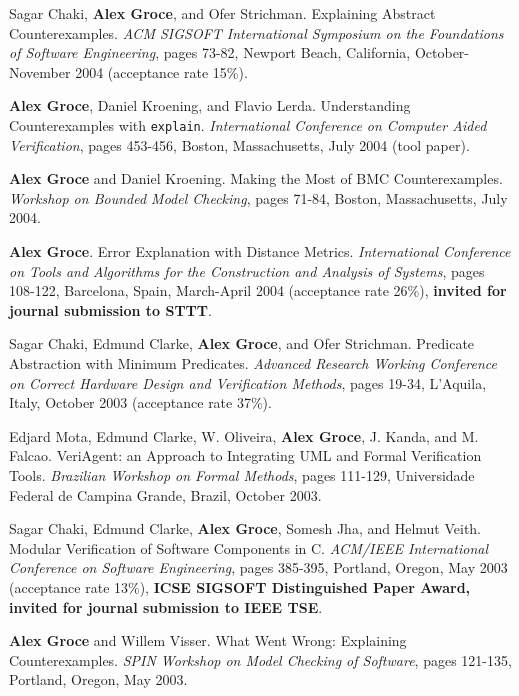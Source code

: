 \documentclass[ComputerScience]{vita}
\begin{document}
\begin{vita}
\begin{Refereed Conference and Workshop Publications}
\item
Sagar Chaki, {\bf Alex Groce}, and Ofer Strichman.
\newblock Explaining Abstract Counterexamples.
\newblock \emph{ACM SIGSOFT International Symposium on the Foundations of Software Engineering},  pages 73-82, Newport Beach, California, October-November 2004 (acceptance rate 15\%).

\item
{\bf Alex Groce}, Daniel Kroening, and Flavio Lerda.
\newblock Understanding Counterexamples with {\tt explain}.
\newblock \emph{International Conference on Computer Aided Verification},  pages 453-456, Boston, Massachusetts, July 2004 (tool paper).

\item
{\bf Alex Groce} and Daniel Kroening.
\newblock Making the Most of BMC Counterexamples.
\newblock \emph{Workshop on Bounded Model Checking},  pages 71-84, Boston, Massachusetts, July 2004.


\item
{\bf Alex Groce}.
\newblock Error Explanation with Distance Metrics.
\newblock \emph{International Conference on Tools and Algorithms for the Construction and Analysis of Systems}, pages 108-122, Barcelona, Spain, March-April 2004 (acceptance rate 26\%), {\bf invited for journal submission to STTT}.

\item
Sagar Chaki, Edmund Clarke, {\bf Alex Groce}, and Ofer Strichman.
\newblock Predicate Abstraction with Minimum Predicates.
\newblock \emph{Advanced Research Working Conference on Correct Hardware Design and Verification Methods}, pages 19-34, L'Aquila, Italy, October 2003 (acceptance rate 37\%).

\item
Edjard Mota, Edmund Clarke, W. Oliveira, {\bf Alex Groce}, J. Kanda, and M. Falcao.
\newblock VeriAgent: an Approach to Integrating UML and Formal Verification Tools.
\newblock \emph{Brazilian Workshop on Formal Methods}, pages 111-129, Universidade Federal de Campina Grande, Brazil, October 2003.

\item 
Sagar Chaki, Edmund Clarke, {\bf Alex Groce}, Somesh Jha, and Helmut Veith.
\newblock Modular Verification of Software Components in C.
\newblock \emph{ACM/IEEE International Conference on Software Engineering}, pages 385-395, Portland, Oregon, May 2003 (acceptance rate 13\%), {\bf ICSE SIGSOFT Distinguished Paper Award, invited for journal submission to IEEE TSE}. 

\item
{\bf Alex Groce} and Willem Visser.
\newblock What Went Wrong: Explaining Counterexamples.
\newblock \emph{SPIN Workshop on Model Checking of Software}, pages 121-135, Portland, Oregon, May 2003.


\end{Refereed Conference and Workshop Publications}
\end{vita}
\end{document}
